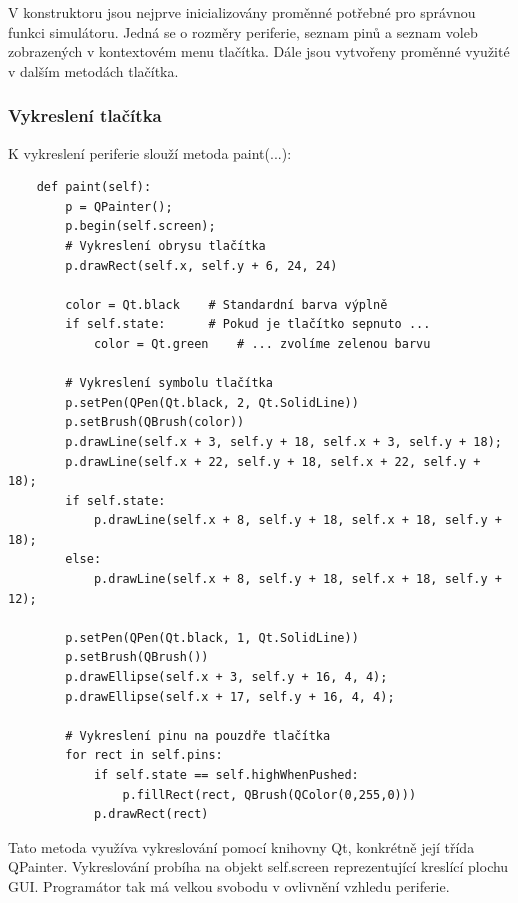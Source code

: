 V konstruktoru jsou nejprve inicializovány proměnné potřebné pro správnou funkci simulátoru. Jedná se o rozměry periferie, seznam pinů a seznam voleb zobrazených v kontextovém menu tlačítka. Dále jsou vytvořeny proměnné využité v dalším metodách tlačítka.

\subsubsection{Vykreslení tlačítka}

K vykreslení periferie slouží metoda paint(...):

\begin{lstlisting}
	def paint(self):
		p = QPainter();
		p.begin(self.screen);
		# Vykreslení obrysu tlačítka
		p.drawRect(self.x, self.y + 6, 24, 24)

		color = Qt.black	# Standardní barva výplně
		if self.state:		# Pokud je tlačítko sepnuto ...
			color = Qt.green	# ... zvolíme zelenou barvu

		# Vykreslení symbolu tlačítka
		p.setPen(QPen(Qt.black, 2, Qt.SolidLine))
		p.setBrush(QBrush(color))
		p.drawLine(self.x + 3, self.y + 18, self.x + 3, self.y + 18);
		p.drawLine(self.x + 22, self.y + 18, self.x + 22, self.y + 18);
		if self.state:
			p.drawLine(self.x + 8, self.y + 18, self.x + 18, self.y + 18);
		else:
			p.drawLine(self.x + 8, self.y + 18, self.x + 18, self.y + 12);

		p.setPen(QPen(Qt.black, 1, Qt.SolidLine))
		p.setBrush(QBrush())
		p.drawEllipse(self.x + 3, self.y + 16, 4, 4);
		p.drawEllipse(self.x + 17, self.y + 16, 4, 4);

		# Vykreslení pinu na pouzdře tlačítka
		for rect in self.pins:
			if self.state == self.highWhenPushed:
				p.fillRect(rect, QBrush(QColor(0,255,0)))
			p.drawRect(rect)
\end{lstlisting}

Tato metoda využíva vykreslování pomocí knihovny Qt, konkrétně její třída QPainter. Vykreslování probíha na objekt self.screen reprezentující kreslící plochu GUI. Programátor tak má velkou svobodu v ovlivnění vzhledu periferie.

